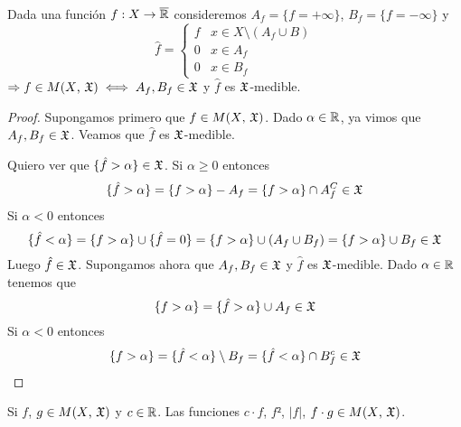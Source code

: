 \begin{lemma}
    Dada una función $f: X \to \overline{\mathbb{R}}$ consideremos $A_f = \{ f = +\infty \}$, $B_f = \{ f = -\infty \}$ y
    \begin{equation*} \hat{f} = \begin{cases}
            f & x \in X \setminus (A_f \cup B) \\
            0 & x \in A_f                      \\
            0 & x \in B_f
        \end{cases}
    \end{equation*}
    $\Rightarrow f \in M(X\text{, } \mathfrak{X}) \iff A_f, B_f \in \mathfrak{X}$ y $\hat{f}$ es $\mathfrak{X}$-medible.
    \begin{proof}
        Supongamos primero que $f \in M(X\text{, } \mathfrak{X})$. Dado $\alpha \in \mathbb{R}$, ya vimos que $A_f, B_f \in \mathfrak{X}$. Veamos que $\hat{f}$ es $\mathfrak{X}$-medible.

        Quiero ver que $\{ \hat{f} > \alpha \} \in \mathfrak{X}$. Si $\alpha \geq 0$ entonces
        \begin{equation*}
            \{ \hat{f} > \alpha \} = \{ f > \alpha \} - A_f = \{ f > \alpha \} \cap A_f^C \in \mathfrak{X}
        \end{equation*}
        Si $\alpha < 0$ entonces \begin{equation*}
            \{ \hat{f} < \alpha \} = \{ f > \alpha \} \cup \{ \hat{f} = 0 \} = \{ f > \alpha \} \cup (A_f \cup B_f) = \{ f > \alpha\} \cup B_f \in \mathfrak{X}
        \end{equation*}
        Luego $\hat{f} \in \mathfrak{X}$. Supongamos ahora que $A_f, B_f \in \mathfrak{X}$ y $\hat{f}$ es $\mathfrak{X}$-medible. Dado $\alpha \in \mathbb{R}$ tenemos que \begin{equation*}
            \{ f > \alpha \} = \{ \hat{f} > \alpha \} \cup A_f \in \mathfrak{X}
        \end{equation*}
        Si $\alpha < 0$ entonces \begin{equation*}
            \{ f > \alpha \} = \{ \hat{f} < \alpha \} \setminus B_f = \{ \hat{f} < \alpha \} \cap B_f^c \in \mathfrak{X}
        \end{equation*}
    \end{proof}
\end{lemma}

\begin{corollary}
    Si $f$, $g \in M(X \text{, } \mathfrak{X})$ y $c \in \mathbb{R}$. Las funciones $c \cdot f$, $f²$, $|f|$, $f \cdot g \in M(X \text{, } \mathfrak{X})$.
\end{corollary}

